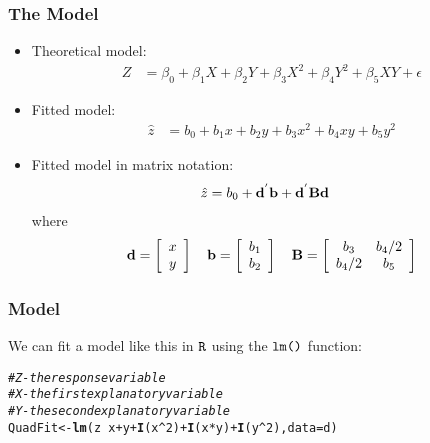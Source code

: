 \documentclass{beamer}\usepackage[]{graphicx}\usepackage[]{color}
\makeatletter
\newcommand{\hlnum}[1]{\textcolor[rgb]{0.686,0.059,0.569}{#1}}%
\newcommand{\hlcom}[1]{\textcolor[rgb]{0.678,0.584,0.686}{\textit{#1}}}%
\newcommand{\hlopt}[1]{\textcolor[rgb]{0,0,0}{#1}}%
\newcommand{\hlstd}[1]{\textcolor[rgb]{0.345,0.345,0.345}{#1}}%
\newcommand{\hlkwb}[1]{\textcolor[rgb]{0.69,0.353,0.396}{#1}}%
\newcommand{\hlkwc}[1]{\textcolor[rgb]{0.333,0.667,0.333}{#1}}%
\newcommand{\hlkwd}[1]{\textcolor[rgb]{0.737,0.353,0.396}{\textbf{#1}}}%
\newenvironment{kframe}{%
 \def\at@end@of@kframe{}%
 \ifinner\ifhmode%
  \def\at@end@of@kframe{\end{minipage}}%
  \begin{minipage}{\columnwidth}%
 \fi\fi%
 \def\FrameCommand##1{\hskip\@totalleftmargin \hskip-\fboxsep
 \colorbox{shadecolor}{##1}\hskip-\fboxsep
     \hskip-\linewidth \hskip-\@totalleftmargin \hskip\columnwidth}%
 \MakeFramed {\advance\hsize-\width
   \@totalleftmargin\z@ \linewidth\hsize
   \@setminipage}}%
 {\par\unskip\endMakeFramed%
 \at@end@of@kframe}
\newenvironment{knitrout}{}{} %
\makeatother
\begin{document}
\begin{frame}
\frametitle{The Model}
\begin{itemize}
  \item Theoretical model:
    \begin{align}
    Z &= \beta_0 + \beta_1 X + \beta_2 Y + \beta_3 X^2 + \beta_4 Y^2 + \beta_5 XY + \epsilon
  \end{align}
  \item Fitted model:
    \begin{align}
    \hat{z} &= b_{0} + b_{1}x + b_{2}y + b_3 x^2 + b_4 xy + b_5 y^2 \label{fittedmod} 
    \end{align}
  \item Fitted model in matrix notation:
\begin{align}
\hat{z} &= b_0 + {\bf d}^{'} {\bf b} + {\bf d}^{'} {\bf B}{\bf d}
\end{align}
where
\[ {\bf d} = \left[ \begin{array}{cc}
x  \\
y 
\end{array} \right]  \quad
%
{\bf b} = \left[ \begin{array}{cc}
b_1  \\
b_2 
\end{array} \right]  \quad
%
{\bf B} = \left[ \begin{array}{cc}
b_3 & b_4 /2 \\
b_4 /2 & b_5
\end{array} \right]
\]
\end{itemize}
\end{frame}


\begin{frame}[fragile]
\frametitle{Model}
We can fit a model like this in $\verb|R|$ using the $\verb|lm()|$ function:
\begin{knitrout}
\color{fgcolor}\begin{kframe}
\begin{alltt}
\hlcom{# Z - the response variable}
\hlcom{# X - the first explanatory variable}
\hlcom{# Y - the second explanatory variable}
\hlstd{QuadFit} \hlkwb{<-} \hlkwd{lm}\hlstd{(z} \hlopt{~} \hlstd{x} \hlopt{+} \hlstd{y} \hlopt{+} \hlkwd{I}\hlstd{(x}\hlopt{^}\hlnum{2}\hlstd{)} \hlopt{+} \hlkwd{I}\hlstd{(x}\hlopt{*}\hlstd{y)} \hlopt{+} \hlkwd{I}\hlstd{(y}\hlopt{^}\hlnum{2}\hlstd{),} \hlkwc{data}\hlstd{=d)}
\end{alltt}
\end{kframe}
\end{knitrout}
\end{frame}
\end{document}
